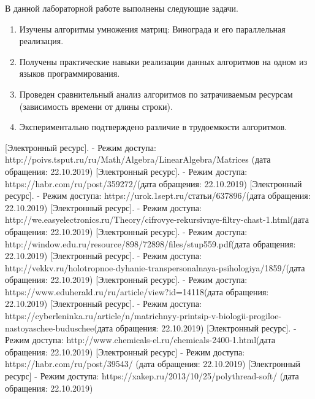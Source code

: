 \documentclass[a4paper,14pt]{article} %
\begin{document}
	\hfill
	
	В данной лабораторной работе выполнены следующие задачи. 
        \begin{enumerate} 
		\item Изучены алгоритмы умножения матриц: Винограда и его параллельная реализация. 
		\item Получены практические навыки реализации данных алгоритмов на одном из языков программирования. 
		\item Проведен сравнительный анализ алгоритмов по затрачиваемым ресурсам (зависимость времени от длины строки). 
		\item Экспериментально подтверждено различие в трудоемкости алгоритмов. 
	\end{enumerate}
        

 	\newpage

        \begin{thebibliography}{}
        		\bibitem{} [Электронный ресурс]. - Режим доступа: http://poivs.tsput.ru/ru/Math/Algebra/LinearAlgebra/Matrices (дата обращения: 22.10.2019)
		\bibitem{}  [Электронный ресурс]. - Режим доступа: https://habr.com/ru/post/359272/(дата обращения: 22.10.2019)
		\bibitem{}  [Электронный ресурс]. - Режим доступа: https://urok.1sept.ru/статьи/637896/(дата обращения: 22.10.2019)
		\bibitem{}  [Электронный ресурс]. - Режим доступа: http://we.easyelectronics.ru/Theory/cifrovye-rekursivnye-filtry-chast-1.html(дата обращения: 22.10.2019)
		\bibitem{}  [Электронный ресурс]. - Режим доступа: http://window.edu.ru/resource/898/72898/files/stup559.pdf(дата обращения: 22.10.2019)
		\bibitem{}  [Электронный ресурс]. - Режим доступа: http://vekkv.ru/holotropnoe-dyhanie-transpersonalnaya-psihologiya/1859/(дата обращения: 22.10.2019)
		\bibitem{} [Электронный ресурс]. - Режим доступа:  https://www.eduherald.ru/ru/article/view?id=14118(дата обращения: 22.10.2019)
		\bibitem{}  [Электронный ресурс]. - Режим доступа: https://cyberleninka.ru/article/n/matrichnyy-printsip-v-biologii-progiloe-nastoyaschee-buduschee(дата обращения: 22.10.2019)
		\bibitem{}  [Электронный ресурс]. - Режим доступа: http://www.chemicals-el.ru/chemicals-2400-1.html(дата обращения: 22.10.2019)
		\bibitem{} [Электронный ресурс] - Режим доступа: https://habr.com/ru/post/39543/ (дата обращения: 22.10.2019)
		\bibitem{} [Электронный ресурс] - Режим доступа: https://xakep.ru/2013/10/25/polythread-soft/ (дата обращения: 22.10.2019)
	\end{thebibliography} 
\end{document}
